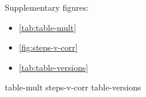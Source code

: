 

Supplementary figures:
\begin{itemize}
\item \cref{tab:table-mult}
\item \cref{fig:steps-v-corr}
\item \cref{tab:table-versions}
\end{itemize}

{table-mult}
{steps-v-corr}
{table-versions}
